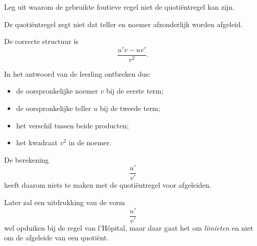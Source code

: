 \documentclass{ximera}
\begin{document}
\begin{oefening}{\oefU\ESS}
\begin{question}
  Leg uit waarom de gebruikte foutieve regel niet de quotiëntregel kan zijn.
  
  \begin{oplossing}
  De quotiëntregel zegt niet dat teller en noemer afzonderlijk worden
  afgeleid.
  
  De correcte structuur is
  \[
  \frac{u'v-uv'}{v^2}.
  \]
  
  In het antwoord van de leerling ontbreken dus:
  
  \begin{itemize}
    \item de oorspronkelijke noemer $v$ bij de eerste term;
    \item de oorspronkelijke teller $u$ bij de tweede term;
    \item het verschil tussen beide producten;
    \item het kwadraat $v^2$ in de noemer.
  \end{itemize}
  
  De berekening
  \[
  \frac{u'}{v'}
  \]
  heeft daarom niets te maken met de quotiëntregel voor afgeleiden.
  
  Later zal een uitdrukking van de vorm
  \[
  \frac{u'}{v'}
  \]
  wel opduiken bij de regel van l'Hôpital, maar daar gaat het om
  \emph{limieten} en niet om de afgeleide van een quotiënt.
  \end{oplossing}
  
  \end{question}
  
  \end{oefening}
\end{document}
